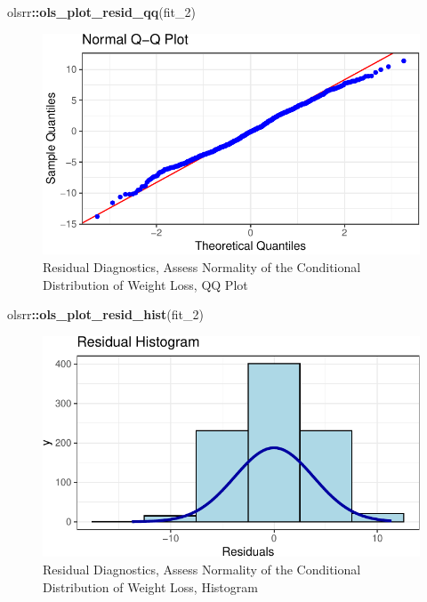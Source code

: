 \documentclass[
]{article}
\newenvironment{Shaded}{\begin{snugshade}}{\end{snugshade}}
\newcommand{\FunctionTok}[1]{\textcolor[rgb]{0.13,0.29,0.53}{\textbf{#1}}}
\newcommand{\NormalTok}[1]{#1}
\newcommand{\SpecialCharTok}[1]{\textcolor[rgb]{0.81,0.36,0.00}{\textbf{#1}}}
\begin{document}
\begin{Shaded}
\begin{Highlighting}[]
\NormalTok{olsrr}\SpecialCharTok{::}\FunctionTok{ols\_plot\_resid\_qq}\NormalTok{(fit\_2)}
\end{Highlighting}
\end{Shaded}

\begin{figure}[hb]

\includegraphics{Appendix_ex_weightloss_files/figure-latex/unnamed-chunk-74-1} \hfill{}

\caption{Residual Diagnostics, Assess Normality of the Conditional Distribution of Weight Loss, QQ Plot}\label{fig:unnamed-chunk-74}
\end{figure}

\begin{Shaded}
\begin{Highlighting}[]
\NormalTok{olsrr}\SpecialCharTok{::}\FunctionTok{ols\_plot\_resid\_hist}\NormalTok{(fit\_2)}
\end{Highlighting}
\end{Shaded}

\begin{figure}[hb]

\includegraphics{Appendix_ex_weightloss_files/figure-latex/unnamed-chunk-75-1} \hfill{}

\caption{Residual Diagnostics, Assess Normality of the Conditional Distribution of Weight Loss, Histogram}\label{fig:unnamed-chunk-75}
\end{figure}
\end{document}
